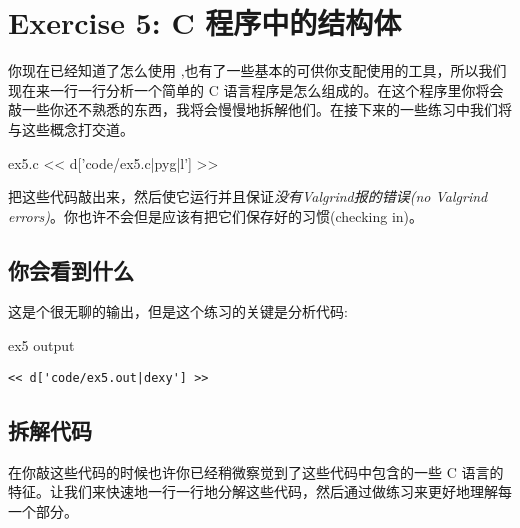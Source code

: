 \chapter{Exercise 5: C 程序中的结构体}

你现在已经知道了怎么使用  ,也有了一些基本的可供你支配使用的工具，所以我们现在来一行一行分析一个简单的 C 语言程序是怎么组成的。在这个程序里你将会敲一些你还不熟悉的东西，我将会慢慢地拆解他们。在接下来的一些练习中我们将与这些概念打交道。

\begin{code}{ex5.c}
<< d['code/ex5.c|pyg|l'] >>
\end{code}

把这些代码敲出来，然后使它运行并且保证\emph{没有Valgrind报的错误(no Valgrind errors)}。你也许不会但是应该有把它们保存好的习惯(checking in)。

\section{你会看到什么}

这是个很无聊的输出，但是这个练习的关键是分析代码:

\begin{code}{ex5 output}
\begin{lstlisting}
<< d['code/ex5.out|dexy'] >>
\end{lstlisting}
\end{code}

\section{拆解代码}

在你敲这些代码的时候也许你已经稍微察觉到了这些代码中包含的一些 C 语言的特征。让我们来快速地一行一行地分解这些代码，然后通过做练习来更好地理解每一个部分。

